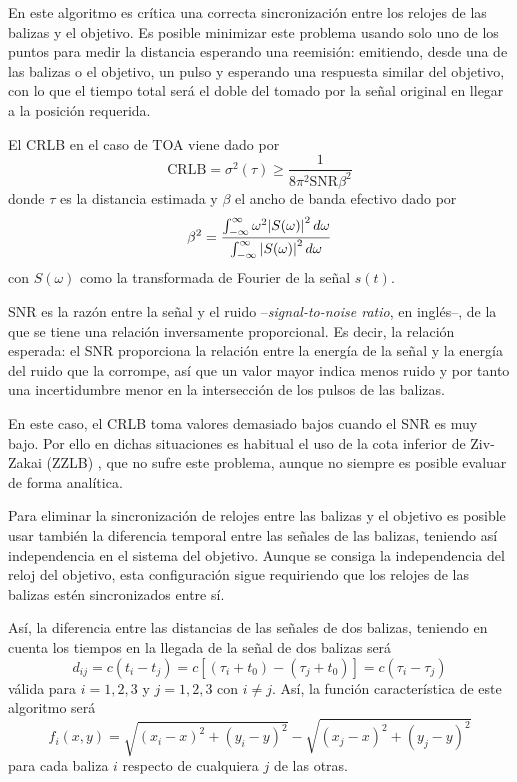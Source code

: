 En este algoritmo es crítica una correcta sincronización entre los relojes de las balizas y el objetivo.
Es posible minimizar este problema usando solo uno de los puntos para medir la distancia esperando una reemisión: emitiendo, desde una de las balizas o el objetivo, un pulso y esperando una respuesta similar del objetivo, con lo que el tiempo total será el doble del tomado por la señal original en llegar a la posición requerida.

El CRLB en el caso de TOA viene dado por \cite{Xbook}
\begin{equation}\label{eq:CRLB_TOA}
    \text{CRLB} = \sigma^2(\tau) \geq \frac{1}{8\pi^2\text{SNR}\beta^2}
\end{equation}
donde $\tau$ es la distancia estimada y $\beta$ el ancho de banda efectivo dado por
\begin{equation}
    \beta^2 = \frac{\int_{-\infty}^{\infty} \omega^2 \abs{S(\omega)}^2\dd{\omega}}{\int_{-\infty}^{\infty} \abs{S(\omega)}^2\dd{\omega}}
\end{equation}
con $S(\omega)$ como la transformada de Fourier de la señal $s(t)$.

SNR es la razón entre la señal y el ruido --\textit{signal-to-noise ratio}, en inglés--, de la que se tiene una relación inversamente proporcional.
Es decir, la relación esperada: el SNR proporciona la relación entre la energía de la señal y la energía del ruido que la corrompe, así que un valor mayor indica menos ruido y por tanto una incertidumbre menor en la intersección de los pulsos de las balizas.

En este caso, el CRLB toma valores demasiado bajos cuando el SNR es muy bajo.
Por ello en dichas situaciones es habitual el uso de la cota inferior de Ziv-Zakai (ZZLB) \cite{soganzi}, que no sufre este problema, aunque no siempre es posible evaluar de forma analítica.


Para eliminar la sincronización de relojes entre las balizas y el objetivo es posible usar también la diferencia temporal entre las señales de las balizas, teniendo así independencia en el sistema del objetivo.
Aunque se consiga la independencia del reloj del objetivo, esta configuración sigue requiriendo que los relojes de las balizas estén sincronizados entre sí.

Así, la diferencia entre las distancias de las señales de dos balizas, teniendo en cuenta los tiempos en la llegada de la señal de dos balizas será
\begin{equation}\label{eq:TDOA}
        d_{ij} = c(t_i - t_j) = c \left[  (\tau_i + t_0) - (\tau_j + t_0)\right] = c(\tau_i - \tau_j)
\end{equation}
válida para $i=1,2,3$ y $j=1,2,3$ con $i \neq j$.
Así, la función característica de este algoritmo será
\begin{equation}
    f_i(x,y) = \sqrt{(x_i - x)^2 + (y_i - y)^2} - \sqrt{(x_j - x)^2 + (y_j - y)^2}
\end{equation}
para cada baliza $i$ respecto de cualquiera $j$ de las otras.

